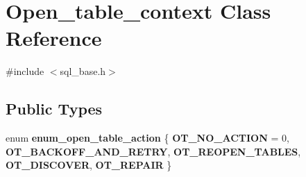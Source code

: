 \hypertarget{classOpen__table__context}{}\section{Open\+\_\+table\+\_\+context Class Reference}
\label{classOpen__table__context}


{\ttfamily \#include $<$sql\+\_\+base.\+h$>$}

\subsection*{Public Types}
\begin{DoxyCompactItemize}
\item 
\mbox{\label{classOpen__table__context_a598143ade01c51a46534ce06fbb9bbab}} 
enum {\bfseries enum\+\_\+open\+\_\+table\+\_\+action} \{ \newline
{\bfseries O\+T\+\_\+\+N\+O\+\_\+\+A\+C\+T\+I\+ON} = 0, 
{\bfseries O\+T\+\_\+\+B\+A\+C\+K\+O\+F\+F\+\_\+\+A\+N\+D\+\_\+\+R\+E\+T\+RY}, 
{\bfseries O\+T\+\_\+\+R\+E\+O\+P\+E\+N\+\_\+\+T\+A\+B\+L\+ES}, 
{\bfseries O\+T\+\_\+\+D\+I\+S\+C\+O\+V\+ER}, 
\newline
{\bfseries O\+T\+\_\+\+R\+E\+P\+A\+IR}
 \}
\end{DoxyCompactItemize}
